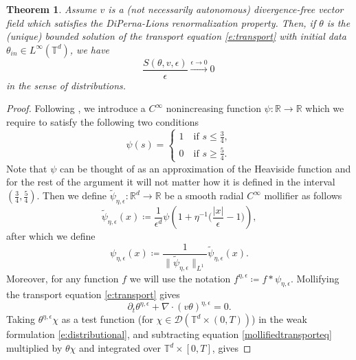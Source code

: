 \documentclass[11pt,reqno]{amsart}
\newtheorem{theorem}{Theorem}[section]
\theoremstyle{definition}
\numberwithin{equation}{section}
\begin{document}
\begin{theorem}\label{t:Yaglom-violated}
Assume $v$ is a (not necessarily autonomous) divergence-free vector field which satisfies the DiPerna-Lions renormalization property.
Then, if $\theta$ is the (unique) bounded solution of the transport equation \eqref{e:transport} with initial data $\theta_{in} \in L^\infty (\mathbb{T}^d)$, we have
\begin{equation}
\frac{S(\theta,v, \epsilon)}{\epsilon} \xrightarrow[]{\epsilon \rightarrow 0} 0 \, 
\end{equation}
in the sense of distributions.
\end{theorem}

\begin{proof}
Following \cite{Novack2024,BoutrosTiti2025}, we introduce a $C^\infty$ nonincreasing function $\psi : \mathbb{R} \rightarrow \mathbb{R}$ which we require to satisfy the following two conditions
\begin{equation}
\psi (s) = \begin{cases}
1 \quad \text{if } s \leq \frac{3}{4}, \\
0 \quad \text{if } s \geq \frac{5}{4}.
\end{cases} 
\end{equation}
Note that $\psi$ can be thought of as an approximation of the Heaviside function and for the rest of the argument it will not matter how it is defined in the interval $(\frac{3}{4},\frac{5}{4})$.
Then we define $\tilde{\psi}_{\eta,\epsilon} : \mathbb{R}^d \rightarrow \mathbb{R}$ be a smooth radial $C^\infty$ mollifier as follows
\begin{equation*}
\tilde{\psi}_{\eta,\epsilon} (x) \coloneqq \frac{1}{\epsilon^d} \psi \left( 1 + \eta^{-1} \bigg( \frac{\lvert x \rvert}{\epsilon} - 1 \bigg) \right),
\end{equation*}
after which we define
\begin{equation}
\psi_{\eta,\epsilon} (x) \coloneqq \frac{1}{\lVert \tilde{\psi}_{\eta,\epsilon} \rVert_{L^1}} \tilde{\psi}_{\eta,\epsilon} (x).
\end{equation}
Moreover, for any function $f$ we will use the notation $f^{\eta,\epsilon} \coloneqq f * \psi_{\eta,\epsilon}$. Mollifying the transport equation \eqref{e:transport} gives
\begin{equation} \label{mollifiedtransporteq}
\partial_t \theta^{\eta,\epsilon} + \nabla \cdot (v \theta)^{\eta,\epsilon} = 0.
\end{equation}
Taking $\theta^{\eta,\epsilon} \chi$ as a test function (for $\chi \in \mathcal{D} (\mathbb{T}^d \times (0,T))$) in the weak formulation \eqref{e:distributional}, and subtracting equation \eqref{mollifiedtransporteq} multiplied by $\theta \chi$ and integrated over $\mathbb{T}^d \times [0,T]$, gives

\end{proof}
\end{document}
